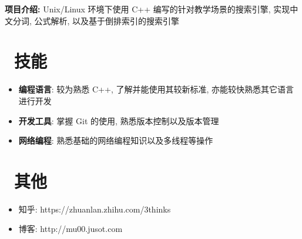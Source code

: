 \documentclass{resume}
\begin{document}
\begin{onehalfspacing}
\textbf{项目介绍: } Unix/Linux 环境下使用 C++ 编写的针对教学场景的搜索引擎, 实现中文分词, 公式解析, 以及基于倒排索引的搜索引擎
\end{onehalfspacing}


\section{\faCogs\ 技能}
\begin{itemize}[parsep=0.5ex]
  \item \textbf{编程语言}: 较为熟悉 C++, 了解并能使用其较新标准, 亦能较快熟悉其它语言进行开发
  \item \textbf{开发工具}: 掌握 Git 的使用, 熟悉版本控制以及版本管理
  \item \textbf{网络编程}: 熟悉基础的网络编程知识以及多线程等操作
\end{itemize}

\section{\faInfo\ 其他}
\begin{itemize}[parsep=0.5ex]
  \item 知乎: https://zhuanlan.zhihu.com/3thinks
  \item 博客: http://mu00.jusot.com
\end{itemize}

%
%
\end{document}
